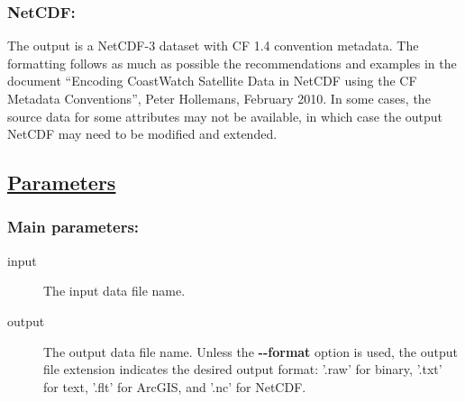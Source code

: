 \subsubsection*{NetCDF:}


 The output is a NetCDF-3 dataset with CF 1.4 convention metadata. The formatting follows as much as possible the recommendations and examples in the document ``Encoding CoastWatch Satellite Data in NetCDF using the CF Metadata Conventions'', Peter Hollemans, February 2010. In some cases, the source data for some attributes may not be available, in which case the output NetCDF may need to be modified and extended.
\subsection*{\underline{Parameters}}
\subsubsection*{Main parameters:}
\begin{description}
\item[ input ] The input data file name. 
\item[ output ] The output data file name. Unless the \textbf{-{-}format}
 option is used, the output file extension indicates the desired output format: '.raw' for binary, '.txt' for text, '.flt' for ArcGIS, and '.nc' for NetCDF. 

\end{description}
